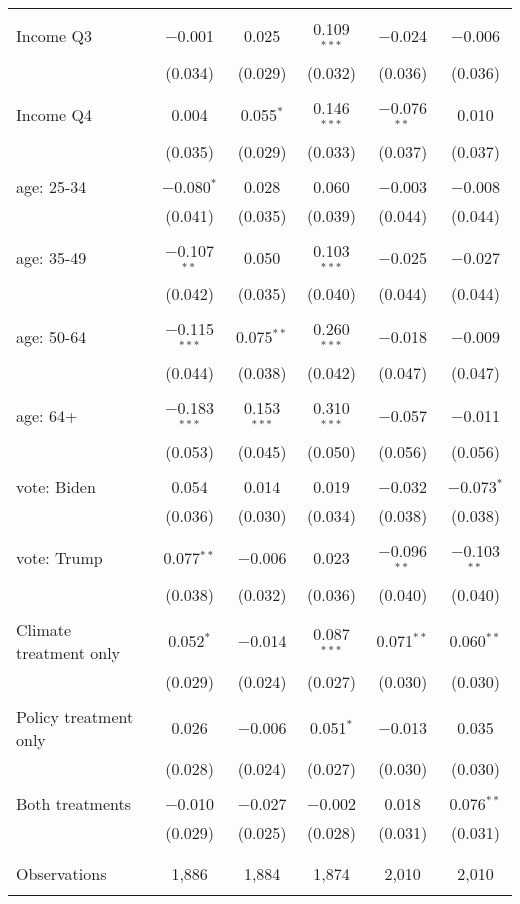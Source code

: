\begin{tabular}{@{\extracolsep{5pt}}lccccc}
  & & & & & \\ 
 Income Q3 & $-$0.001 & 0.025 & 0.109$^{***}$ & $-$0.024 & $-$0.006 \\ 
  & (0.034) & (0.029) & (0.032) & (0.036) & (0.036) \\ 
  & & & & & \\ 
 Income Q4 & 0.004 & 0.055$^{*}$ & 0.146$^{***}$ & $-$0.076$^{**}$ & 0.010 \\ 
  & (0.035) & (0.029) & (0.033) & (0.037) & (0.037) \\ 
  & & & & & \\ 
 age: 25-34 & $-$0.080$^{*}$ & 0.028 & 0.060 & $-$0.003 & $-$0.008 \\ 
  & (0.041) & (0.035) & (0.039) & (0.044) & (0.044) \\ 
  & & & & & \\ 
 age: 35-49 & $-$0.107$^{**}$ & 0.050 & 0.103$^{***}$ & $-$0.025 & $-$0.027 \\ 
  & (0.042) & (0.035) & (0.040) & (0.044) & (0.044) \\ 
  & & & & & \\ 
 age: 50-64 & $-$0.115$^{***}$ & 0.075$^{**}$ & 0.260$^{***}$ & $-$0.018 & $-$0.009 \\ 
  & (0.044) & (0.038) & (0.042) & (0.047) & (0.047) \\ 
  & & & & & \\ 
 age: 64+ & $-$0.183$^{***}$ & 0.153$^{***}$ & 0.310$^{***}$ & $-$0.057 & $-$0.011 \\ 
  & (0.053) & (0.045) & (0.050) & (0.056) & (0.056) \\ 
  & & & & & \\ 
 vote: Biden & 0.054 & 0.014 & 0.019 & $-$0.032 & $-$0.073$^{*}$ \\ 
  & (0.036) & (0.030) & (0.034) & (0.038) & (0.038) \\ 
  & & & & & \\ 
 vote: Trump & 0.077$^{**}$ & $-$0.006 & 0.023 & $-$0.096$^{**}$ & $-$0.103$^{**}$ \\ 
  & (0.038) & (0.032) & (0.036) & (0.040) & (0.040) \\ 
  & & & & & \\ 
 Climate treatment only & 0.052$^{*}$ & $-$0.014 & 0.087$^{***}$ & 0.071$^{**}$ & 0.060$^{**}$ \\ 
  & (0.029) & (0.024) & (0.027) & (0.030) & (0.030) \\ 
  & & & & & \\ 
 Policy treatment only & 0.026 & $-$0.006 & 0.051$^{*}$ & $-$0.013 & 0.035 \\ 
  & (0.028) & (0.024) & (0.027) & (0.030) & (0.030) \\ 
  & & & & & \\ 
 Both treatments & $-$0.010 & $-$0.027 & $-$0.002 & 0.018 & 0.076$^{**}$ \\ 
  & (0.029) & (0.025) & (0.028) & (0.031) & (0.031) \\ 
  & & & & & \\ 
\hline \\[-1.8ex] 

Observations & 1,886 & 1,884 & 1,874 & 2,010 & 2,010 \\ 
\hline 
\hline \\[-1.8ex] 
\end{tabular} 